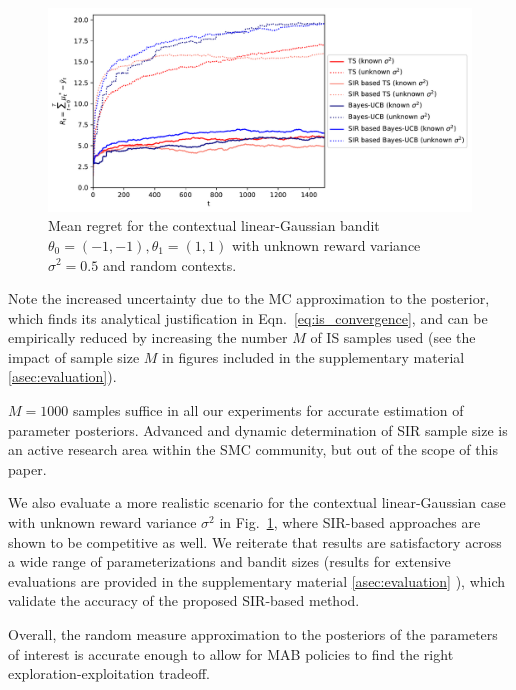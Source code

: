 \documentclass{article}
\def\addappendix{}
\begin{document}
\begin{figure}[!h]
	\begin{center}
		\centerline{\includegraphics[width=\columnwidth]{./figs/static/linearGaussian/cumulative_regret_all}}
		\caption{Mean regret for the contextual linear-Gaussian bandit $\theta_0=(-1,-1),\theta_1=(1,1)$ with unknown reward variance $\sigma^2=0.5$ and random contexts.}
		\label{fig:static_bandits_linearGaussian_all}
	\end{center}
\vspace*{-0.5cm}
\end{figure}

Note the increased uncertainty due to the MC approximation to the posterior, which finds its analytical justification in Eqn.~\eqref{eq:is_convergence}, and can be empirically reduced by increasing the number $M$ of IS samples used (see the impact of sample size $M$ in figures included in
\ifx\addappendix\undefined the supplementary material \else \autoref{asec:evaluation}\fi).

$M=1000$ samples suffice in all our experiments for accurate estimation of parameter posteriors. Advanced and dynamic determination of SIR sample size is an active research area within the SMC community, but out of the scope of this paper.

We also evaluate a more realistic scenario for the contextual linear-Gaussian case with unknown reward variance $\sigma^2$ in Fig.~\ref{fig:static_bandits_linearGaussian_all}, where SIR-based approaches are shown to be competitive as well. We reiterate that results are satisfactory across a wide range of parameterizations and bandit sizes (results for extensive evaluations are provided in \ifx\addappendix\undefined the supplementary material \else \autoref{asec:evaluation} \fi), which validate the accuracy of the proposed SIR-based method.

Overall, the random measure approximation to the posteriors of the parameters of interest is accurate enough to allow for MAB policies to find the right exploration-exploitation tradeoff.
\end{document}

